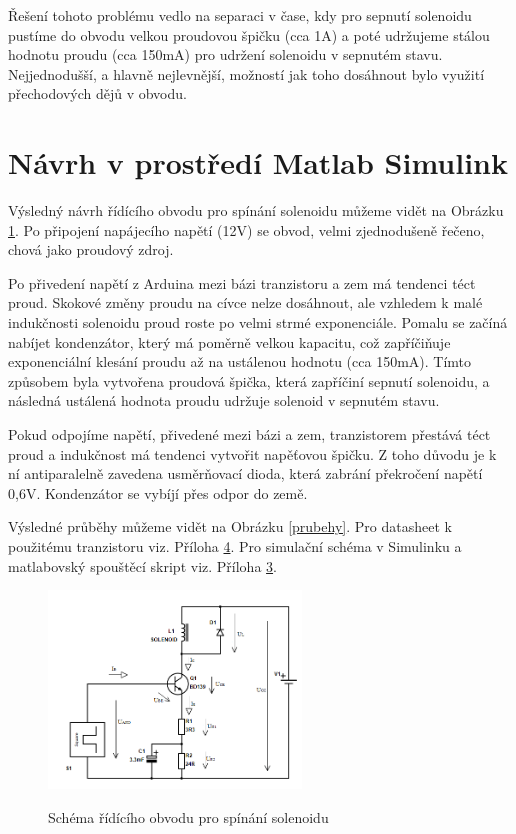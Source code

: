 \documentclass[12pt,oneside]{book} %
\begin{document}
\qquad Řešení tohoto problému vedlo na separaci v čase, kdy pro sepnutí solenoidu pustíme do obvodu velkou proudovou špičku (cca 1A) a poté udržujeme stálou hodnotu proudu (cca 150mA) pro udržení solenoidu v sepnutém stavu. Nejjednodušší, a hlavně nejlevnější, možností jak toho dosáhnout bylo využití přechodových dějů v obvodu.

\section{Návrh v prostředí Matlab Simulink}\label{matsim}
Výsledný návrh řídícího obvodu pro spínání solenoidu můžeme vidět na Obrázku \ref{schema0}. Po připojení napájecího napětí (12V) se obvod, velmi zjednodušeně řečeno, chová jako proudový zdroj.

\qquad Po přivedení napětí z Arduina mezi bázi tranzistoru a zem má tendenci téct proud. Skokové změny proudu na cívce nelze dosáhnout, ale vzhledem k malé indukčnosti solenoidu proud roste po velmi strmé exponenciále. Pomalu se začíná nabíjet kondenzátor, který má poměrně velkou kapacitu, což zapříčiňuje exponenciální klesání proudu až na ustálenou hodnotu (cca 150mA). Tímto způsobem byla vytvořena proudová špička, která zapříčiní sepnutí solenoidu, a následná ustálená hodnota proudu udržuje solenoid v sepnutém stavu.

\qquad Pokud odpojíme napětí, přivedené mezi bázi a zem, tranzistorem přestává téct proud a indukčnost má tendenci vytvořit napěťovou špičku. Z toho důvodu je k ní antiparalelně zavedena usměrňovací dioda, která zabrání překročení napětí 0,6V. Kondenzátor se vybíjí přes odpor do země.

\quad Výsledné průběhy můžeme vidět na Obrázku \ref{prubehy}. Pro datasheet k použitému tranzistoru viz. Příloha \hyperref[Prilohy]{4}. Pro simulační schéma v Simulinku a matlabovský spouštěcí skript viz. Příloha \hyperref[Prilohy]{3}.

\begin{figure}[ht] \large\centering
\includegraphics[width=0.60\textwidth]{./img/schema0.png}\\[1cm] 
\caption{Schéma řídícího obvodu pro spínání solenoidu}
\label{schema0}
\end{figure} 
\end{document}
